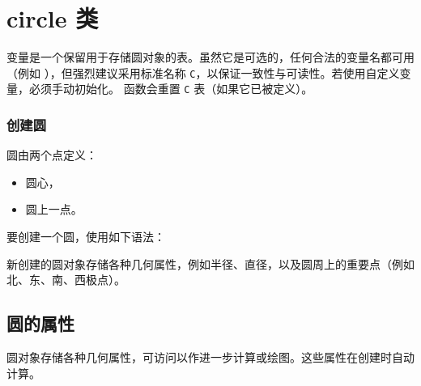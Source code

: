 \newpage
\section{circle 类}

 变量是一个保留用于存储圆对象的表。虽然它是可选的，任何合法的变量名都可用（例如 ），但强烈建议采用标准名称 \texttt{C}，以保证一致性与可读性。若使用自定义变量，必须手动初始化。 函数会重置 \texttt{C} 表（如果它已被定义）。


\subsubsection{创建圆}
\label{ssub:creating_a_circle}
圆由两个点定义：
\begin{itemize}
\item 圆心，
\item 圆上一点。
\end{itemize}
\vspace{0.5em}

要创建一个圆，使用如下语法：
\begin{mybox}
\end{mybox}

新创建的圆对象存储各种几何属性，例如半径、直径，以及圆周上的重要点（例如北、东、南、西极点）。

\subsection{圆的属性}

圆对象存储各种几何属性，可访问以作进一步计算或绘图。这些属性在创建时自动计算。

\vspace{1em}

